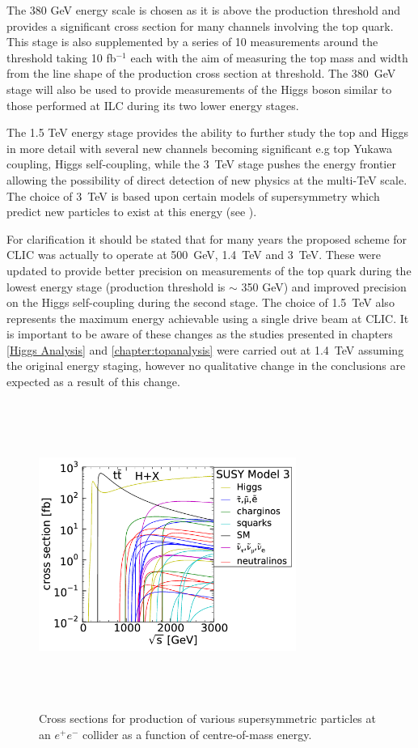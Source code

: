 The 380 GeV energy scale is chosen as it is above the \ttbar production threshold and provides a significant cross section for many channels involving the top quark. This stage is also supplemented by a series of 10 measurements around the \ttbar threshold taking 10 fb${^{-1}}$ each with the aim of measuring the top mass and width from the line shape of the \ttbar production cross section at threshold. The 380~GeV stage will also be used to provide measurements of the Higgs boson similar to those performed at \ac{ILC} during its two lower energy stages.

The 1.5 TeV energy stage provides the ability to further study the top and Higgs in more detail with several new channels becoming significant e.g top Yukawa coupling, Higgs self-coupling, while the 3~TeV stage pushes the energy frontier allowing the possibility of direct detection of new physics at the multi-TeV scale. The choice of 3~TeV is based upon certain models of supersymmetry which predict new particles to exist at this energy (see ).

For clarification it should be stated that for many years the proposed scheme for CLIC was actually to operate at 500~GeV, 1.4~TeV and 3~TeV. These were updated to provide better precision on measurements of the top quark during the lowest energy stage (\ttbar production threshold is $\sim$ 350 GeV) and improved precision on the Higgs self-coupling during the second stage. The choice of 1.5~TeV also represents the maximum energy achievable using a single drive beam at \ac{CLIC}\cite{CLIC:2016zwp}. It is important to be aware of these changes as the studies presented in chapters \ref{Higgs Analysis} and \ref{chapter:topanalysis} were carried out at 1.4~TeV assuming the original energy staging, however no qualitative change in the conclusions are expected as a result of this change.  

\begin{figure}
  \centering
  \includegraphics[width=0.75\textwidth,height=10cm,keepaspectratio]{Experiments/fig/clicSS}
  \caption[Cross Sections For Supersymmetric Processes at \ac{CLIC}]{Cross sections for production of various supersymmetric particles at an ${e^+e^-}$ collider as a function of centre-of-mass energy\cite{CDR}.}
  \label{Fig:SuperSym}
\end{figure}

